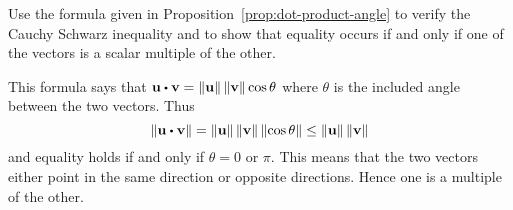\begin{ex}
  Use the formula given in Proposition~\ref{prop:dot-product-angle} to
  verify the Cauchy Schwarz inequality and to show that equality
  occurs if and only if one of the vectors is a scalar multiple of the
  other.
  \begin{sol}
    This formula says that
    $\vect{u}\dotprod \vect{v}=\norm{\vect{u}} \norm{\vect{v}} \cos
    \theta$ where $\theta$ is the included angle between the two
    vectors. Thus
    \begin{equation*}
      \norm{\vect{u}\dotprod \vect{v}} =\norm{\vect{u}}
      \norm{\vect{v}} \norm{\cos \theta} \leq
      \norm{\vect{u}} \norm{\vect{v}}
    \end{equation*}
    and equality holds if and only if $\theta =0$ or $\pi$. This means
    that the two vectors either point in the same direction or
    opposite directions. Hence one is a multiple of the other.
  \end{sol}
\end{ex}
